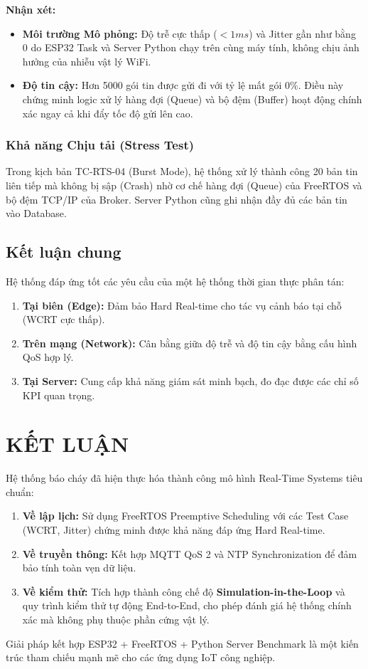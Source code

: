 \documentclass[12pt,a4paper]{report}
\begin{document}
\textbf{Nhận xét:} 
\begin{itemize}
    \item \textbf{Môi trường Mô phỏng:} Độ trễ cực thấp ($<1ms$) và Jitter gần như bằng 0 do ESP32 Task và Server Python chạy trên cùng máy tính, không chịu ảnh hưởng của nhiễu vật lý WiFi.
    \item \textbf{Độ tin cậy:} Hơn 5000 gói tin được gửi đi với tỷ lệ mất gói 0\%. Điều này chứng minh logic xử lý hàng đợi (Queue) và bộ đệm (Buffer) hoạt động chính xác ngay cả khi đẩy tốc độ gửi lên cao.
\end{itemize}



\subsection{Khả năng Chịu tải (Stress Test)}
Trong kịch bản TC-RTS-04 (Burst Mode), hệ thống xử lý thành công 20 bản tin liên tiếp mà không bị sập (Crash) nhờ cơ chế hàng đợi (Queue) của FreeRTOS và bộ đệm TCP/IP của Broker. Server Python cũng ghi nhận đầy đủ các bản tin vào Database.

\section{Kết luận chung}
Hệ thống đáp ứng tốt các yêu cầu của một hệ thống thời gian thực phân tán:
\begin{enumerate}
    \item \textbf{Tại biên (Edge):} Đảm bảo Hard Real-time cho tác vụ cảnh báo tại chỗ (WCRT cực thấp).
    \item \textbf{Trên mạng (Network):} Cân bằng giữa độ trễ và độ tin cậy bằng cấu hình QoS hợp lý.
    \item \textbf{Tại Server:} Cung cấp khả năng giám sát minh bạch, đo đạc được các chỉ số KPI quan trọng.
\end{enumerate}


\chapter*{KẾT LUẬN}

Hệ thống báo cháy đã hiện thực hóa thành công mô hình Real-Time Systems tiêu chuẩn:
\begin{enumerate}
    \item \textbf{Về lập lịch:} Sử dụng FreeRTOS Preemptive Scheduling với các Test Case (WCRT, Jitter) chứng minh được khả năng đáp ứng Hard Real-time.
    \item \textbf{Về truyền thông:} Kết hợp MQTT QoS 2 và NTP Synchronization để đảm bảo tính toàn vẹn dữ liệu.
    \item \textbf{Về kiểm thử:} Tích hợp thành công chế độ \textbf{Simulation-in-the-Loop} và quy trình kiểm thử tự động End-to-End, cho phép đánh giá hệ thống chính xác mà không phụ thuộc phần cứng vật lý.
\end{enumerate}

Giải pháp kết hợp ESP32 + FreeRTOS + Python Server Benchmark là một kiến trúc tham chiếu mạnh mẽ cho các ứng dụng IoT công nghiệp.
\end{document}

